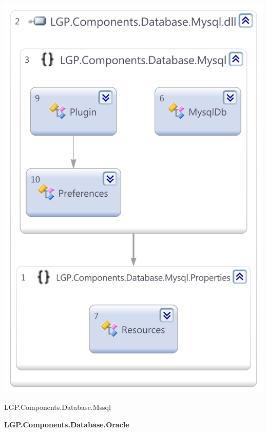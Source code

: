\begin{multicols}{2}
			\begin{figurehere}
				\centering
				\includegraphics[scale=0.35]{pages/appendix3/figures/dllscreens/mssql.png}
				\caption{LGP.Components.Database.Mssql}
			\end{figurehere}
		
		\columnbreak
		
				
		\large{\bfseries{LGP.Components.Database.Oracle}}
		\vspace{5mm}
		

\end{multicols}
